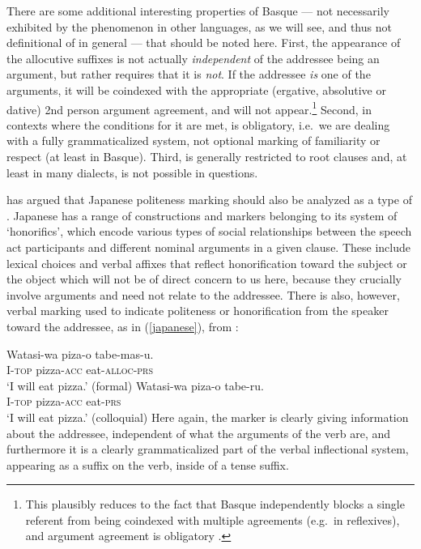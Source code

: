 \documentclass[output=paper, modfonts, nonflat]{langsci/langscibook}
\begin{document}
There are some additional interesting properties of Basque \allagr{}
--- not necessarily exhibited by the phenomenon in other languages, as
we will see, and thus not definitional of \allagr{} in general ---
that should be noted here. First, the appearance of the allocutive
suffixes is not actually \emph{independent} of the addressee being an
argument, but rather requires that it is \emph{not}. If the addressee
\emph{is} one of the arguments, it will be coindexed with the
appropriate (ergative, absolutive or dative) 2nd person argument
agreement, and \allagr{} will not appear.\footnote{This plausibly
  reduces to the fact that Basque independently blocks a single
  referent from being coindexed with multiple agreements (e.g.\ in
  reflexives), and argument agreement is obligatory
  \citep{antonov:2015}.} Second, in contexts where the conditions for
it are met, \allagr{} is obligatory, i.e.\ we are dealing with a fully
grammaticalized system, not optional marking of familiarity or respect
(at least in Basque). Third, \allagr{} is generally restricted to root
clauses and, at least in many dialects, is not possible in questions.

\citet{miyagawa:2017} has argued that Japanese politeness marking
should also be analyzed as a type of \allagr{}. Japanese has a range
of constructions and markers belonging to its system of `honorifics',
which encode various types of social relationships between the speech
act participants and different nominal arguments in a given
clause. These include lexical choices and verbal affixes that reflect
honorification toward the subject or the object which will not be of
direct concern to us here, because they crucially involve arguments
and need not relate to the addressee. There is also, however, verbal
marking used to indicate politeness or honorification from the speaker
toward the addressee, as in (\ref{japanese}), from
\citet{miyagawa:2017}:

\ea\label{japanese}
  \ea\label{fjap}\gll Watasi-wa piza-o tabe-mas-u.\\
  I-\textsc{top} pizza-\textsc{acc}{} eat-\textsc{alloc}-\textsc{prs}\\
  \glt `I will eat pizza.' (formal)
  \ex\label{cjap}\gll Watasi-wa piza-o tabe-ru.\\
  I-\textsc{top} pizza-\textsc{acc}{} eat-\textsc{prs}\\
  \glt `I will eat pizza.' (colloquial)
  \z
\z
%
Here again, the marker is clearly giving information about the
addressee, independent of what the arguments of the verb are, and
furthermore it is a clearly grammaticalized part of the verbal
inflectional system, appearing as a suffix on the verb, inside of a
tense suffix. 
\end{document}
